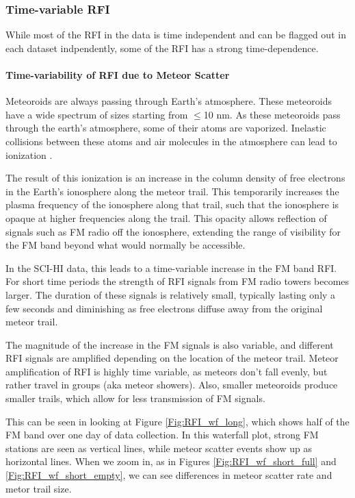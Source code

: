 \subsubsection{Time-variable RFI}

While most of the RFI in the data is time independent and can be flagged out in each dataset indpendently, some of the RFI has a strong time-dependence. 

\paragraph{Time-variability of RFI due to Meteor Scatter}

Meteoroids are always passing through Earth's atmosphere. These meteoroids have a wide spectrum of sizes starting from $\leq$10 nm. As these meteoroids pass through the earth's atmosphere, some of their atoms are vaporized. Inelastic collisions between these atoms and air molecules in the atmosphere can lead to ionization \cite{meteor_review}. 

The result of this ionization is an increase in the column density of free electrons  in the Earth's ionosphere along the meteor trail. This temporarily increases the plasma frequency of the ionosphere along that trail, such that the ionosphere is opaque at higher frequencies along the trail. This opacity allows reflection of signals such as FM radio off the ionosphere, extending the range of visibility for the FM band beyond what would normally be accessible.

In the SCI-HI data, this leads to a time-variable increase in the FM band RFI. For short time periods the strength of RFI signals from FM radio towers becomes larger. The duration of these signals is relatively small, typically lasting only a few seconds and diminishing as free electrons diffuse away from the original meteor trail. 

The magnitude of the increase in the FM signals is also variable, and different RFI signals are amplified depending on the location of the meteor trail. Meteor amplification of RFI is highly time variable, as meteors don't fall evenly, but rather travel in groups (aka meteor showers). Also, smaller meteoroids produce smaller trails, which allow for less transmission of FM signals.

This can be seen in looking at Figure \ref{Fig:RFI_wf_long}, which shows half of the FM band over one day of data collection. In this waterfall plot, strong FM stations are seen as vertical lines, while meteor scatter events show up as horizontal lines. When we zoom in, as in Figures \ref{Fig:RFI_wf_short_full} and \ref{Fig:RFI_wf_short_empty}, we can see differences in meteor scatter rate and metor trail size.


